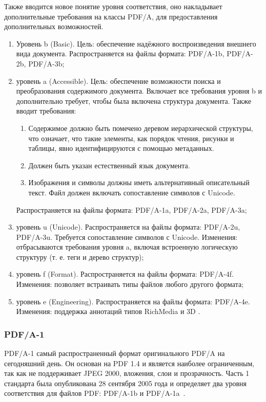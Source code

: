 Также вводится новое понятие уровня соответствия, оно накладывает дополнительные требования на классы PDF/A, для предоставления дополнительных возможностей.
\begin{enumerate}
	\item Уровень b (Basic).
	Цель: обеспечение надёжного воспроизведения внешнего вида документа.
	Распространяется на файлы формата: PDF/A-1b, PDF/A-2b, PDF/A-3b;
	\item уровень a (Accessible).
	Цель: обеспечение возможности поиска и преобразования содержимого документа.
	Включает все требования уровня b и дополнительно требует, чтобы была включена структура документа.
	Также вводит требования:
	\begin{enumerate}
		\item Содержимое должно быть помечено деревом иерархической структуры, что означает, что такие элементы, как порядок чтения, рисунки и таблицы, явно идентифицируются с помощью метаданных.
		\item Должен быть указан естественный язык документа.
		\item Изображения и символы должны иметь альтернативный описательный текст.
		Файл должен включать сопоставление символов с Unicode.
	\end{enumerate}
	Распространяется на файлы формата: PDF/A-1a, PDF/A-2a, PDF/A-3a;
	
	\item уровень u (Unicode).
	Распространяется на файлы формата: PDF/A-2u, PDF/A-3u.
	Требуется сопоставление символов с Unicode.
	Изменения:
	отбрасываются требования уровня a, включая встроенную логическую структуру (т. е. теги и дерево структур);
	
	\item уровень f (Format).
	Распространяется на файлы формата: PDF/A-4f.
	Изменения:
	позволяет встраивать типы файлов любого другого формата;
	
	\item уровень e (Engineering).
	Распространяется на файлы формата: PDF/A-4e.
	Изменения:
	поддержка аннотаций типов RichMedia и 3D \cite{pdf_levels_std}.
\end{enumerate}


\subsubsection{PDF/A-1}
PDF/A-1 самый распространенный формат оригинального PDF/A на сегодняшний день. Он основан на PDF 1.4 и является наиболее ограниченным, так как не поддерживает JPEG 2000, вложения, слои и прозрачность. Часть 1 стандарта была опубликована 28 сентября 2005 года и определяет два уровня соответствия для файлов PDF: PDF/A-1b и PDF/A-1a~\cite{pdf_a_2}.


